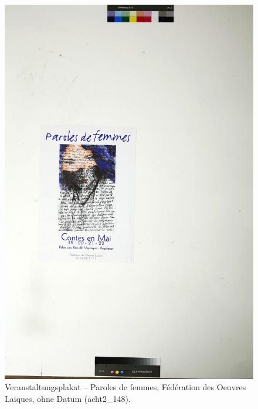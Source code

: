 \documentclass[a4paper,12pt,ngerman]{article}
\begin{document}
\newpage
\begin{figure}[ht]
\includegraphics[width=\linewidth]{Abbildung_48_(acht2_148)}
\centering
\caption{Veranstaltungsplakat -- Paroles de femmes, Fédération des Oeuvres Laiques, ohne Datum (acht2\_148).}
\end{figure}
\end{document}

